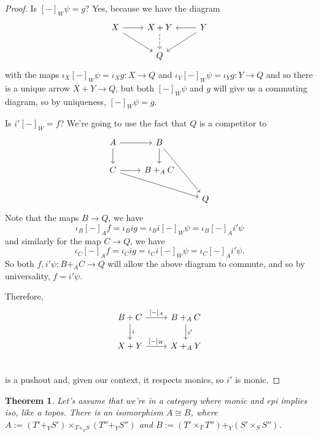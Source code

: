 \documentclass[12pt]{article}
\newcommand{\from}{\colon}
\renewcommand{\(}{\left(}
\renewcommand{\)}{\right)}
\renewcommand{\{}{\left\lbrace}
\renewcommand{\}}{\right\rbrace}
\newtheorem*{thm}{Theorem}
\theoremstyle{remark}
\theoremstyle{definition}
\begin{document}
\begin{proof}
 	Is $[-]_W \psi = g$?  Yes, because we have the diagram
 	\[
 	\begin{tikzcd}
	 	{X} \ar[r] \ar[dr] &
	 	{X+Y} \ar[d,dashed] &
	 	{Y} \ar[l] \ar[dl]\\
	 	{} &
	 	{Q} &
	 	{}
 	\end{tikzcd}
 	\]
 	with the maps $\iota_X[-]_W\psi = \iota_X g \from X \to Q$ and $\iota_Y[-]_W\psi = \iota_Y g \from Y \to Q$ and so there is a unique arrow $X+Y \to Q$, but both $[-]_W\psi$ and $g$ will give us a commuting diagram, so by uniqueness, $[-]_W\psi=g$.  
 	
 	Is $i'[-]_W=f$? We're going to use the fact that $Q$ is a competitor to
 	\[
 	\begin{tikzcd}
	 	{A} \ar[r] \ar[d] &
	 	{B} \ar[d] \ar[ddr]&
	 	{} \\
	 	{C} \ar[r] \ar[drr]&
	 	{B+_AC} &
	 	{} \\
	 	{} &
	 	{} &
	 	{Q}
 	\end{tikzcd}
 	\]
 	Note that the maps $B \to Q$, we have 
 	\[
	 	\iota_B [-]_A f 
		 	= \iota_B i g 
		 	= \iota_B i [-]_W \psi
		 	= \iota_B [-]_A i' \psi
 	\]
 	and similarly for the map $C \to Q$, we have
 	\[
	 	\iota_C [-]_A f 
	 	= \iota_C i g 
	 	= \iota_C i [-]_W \psi
	 	= \iota_C [-]_A i' \psi.
 	\]
 	So both $f,i' \psi \from B+_AC \to Q$ will allow the above diagram to commute, and so by universality, $f=i'\psi$.  
 	
 	Therefore, 
 	\[
 	\begin{tikzcd}
	 	{B+C} \ar[r,"{[-]_A}"] \ar[d,"i"] &
	 	{B+_AC} \ar[d,"i'"]\\
	 	{X+Y} \ar[r,"{[-]_W}"] &
	 	{X+_AY} \\
 	\end{tikzcd}
 	\]
 	is a pushout and, given our context, it respects monics, so $i'$ is monic. 	
 \end{proof}
 
 
 \begin{thm}
 	Let's assume that we're in a category where monic and epi implies iso, like 
 	a topos. There is an isomorphism $A \cong B$, where $A := 
 	(T'+_YS')\times_{T+_YS}(T''+_YS'')$ and $B := (T' \times_T T'') +_Y 
 	(S'\times_SS'')$.  
 \end{thm}
 
\end{document}
